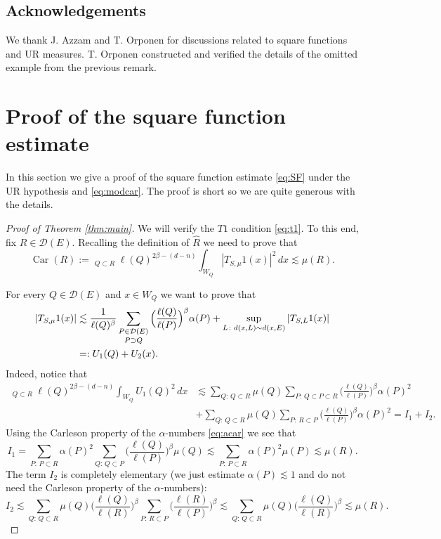 \documentclass[11pt,a4paper,leqno]{amsart}
\numberwithin{equation}{section}
\newcommand{\Car}[0]{\operatorname{Car}}%
\theoremstyle{plain}
\theoremstyle{definition}
\theoremstyle{remark}
\begin{document}
\subsection*{Acknowledgements}
We thank  J. Azzam and T. Orponen for discussions related to square functions and  UR measures. T. Orponen constructed and verified the details of the omitted
example from the previous remark.

\section{Proof of the square function estimate}
In this section we give a proof of the square function estimate \eqref{eq:SF} under the UR hypothesis and \eqref{eq:modcar}.
The proof is short so we are quite generous with the details. 
\begin{proof}[Proof of Theorem \ref{thm:main}]
We will verify the $T1$ condition  \eqref{eq:t1}. To this end, fix $R \in \mathcal{D}(E)$. Recalling the definition of $\widehat R$ we need to prove that
\begin{displaymath}
\Car(R) := \mathop{\sum_{Q\in\mathcal{D}(E)}}_{Q \subset R} \ell(Q)^{2\beta-(d-n)} \int_{W_Q} |T_{S,\mu}1(x)|^2\, dx \lesssim \mu(R).
\end{displaymath}

For every $Q \in \mathcal{D}(E)$ and $x \in W_Q$ we want to prove that
\begin{align}\label{eq:main}
|T_{S,\mu}1(x)| & \lesssim \frac{1}{\ell(Q)^{\beta}} \mathop{\sum_{P \in \mathcal{D}(E) }}_{P \supset Q} \Big( \frac{\ell(Q)}{\ell(P)} \Big)^{\beta} \alpha(P)
+  \sup_{L\colon d(x,L) \sim d(x,E)} |T_{S,L}1(x)| \\
&=: U_1(Q) + U_2(x). \notag
\end{align}
Indeed, notice that
\begin{align*}
\mathop{\sum_{Q\in\mathcal{D}(E)}}_{Q \subset R} \ell(Q)^{2\beta-(d-n)} \int_{W_Q} U_1(Q)^2\, dx &\lesssim
\sum_{Q:\,Q \subset R} \mu(Q) \sum_{P:\, Q \subset P \subset R}  \Big( \frac{\ell(Q)}{\ell(P)} \Big)^{\beta} \alpha(P)^2 \\
&+ \sum_{Q:\,Q \subset R} \mu(Q) \sum_{P:\, R \subset P}  \Big( \frac{\ell(Q)}{\ell(P)} \Big)^{\beta} \alpha(P)^2 = I_1 + I_2.
\end{align*}
Using the Carleson property of the $\alpha$-numbers \eqref{eq:acar} we see that
\begin{displaymath}
I_1 = \sum_{P:\,P \subset R} \alpha(P)^2 \sum_{Q:\,Q \subset P} \Big( \frac{\ell(Q)}{\ell(P)} \Big)^{\beta} \mu(Q) \lesssim \sum_{P:\,P \subset R} \alpha(P)^2 \mu(P) \lesssim \mu(R).
\end{displaymath}
The term $I_2$ is completely elementary (we just estimate $\alpha(P) \lesssim 1$ and do not need the Carleson property of the $\alpha$-numbers):
\begin{displaymath}
I_2 \lesssim \sum_{Q:\,Q \subset R} \mu(Q) \Big( \frac{\ell(Q)}{\ell(R)} \Big)^{\beta} \sum_{P:\,R \subset P} \Big( \frac{\ell(R)}{\ell(P)} \Big)^{\beta} \lesssim \sum_{Q:\,Q \subset R} \mu(Q) \Big( \frac{\ell(Q)}{\ell(R)} \Big)^{\beta} \lesssim \mu(R).
\end{displaymath}


\end{proof}
\end{document}

